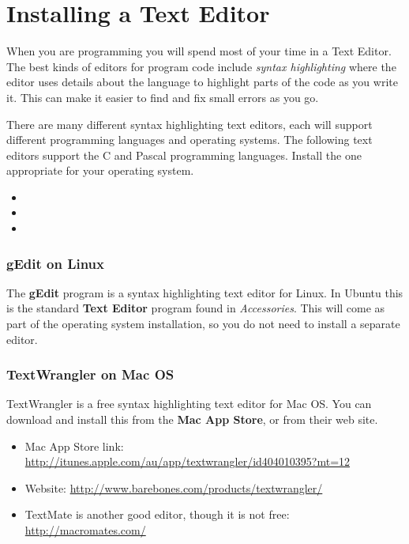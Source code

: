 \clearpage
\def\pageLang{none}
\section{Installing a Text Editor} %
\label{sec:installing_a_text_editor}

When you are programming you will spend most of your time in a Text Editor. The best kinds of editors for program code include \emph{syntax highlighting} where the editor uses details about the language to highlight parts of the code as you write it. This can make it easier to find and fix small errors as you go.

There are many different syntax highlighting text editors, each will support different programming languages and operating systems. The following text editors support the C and Pascal programming languages. Install the one appropriate for your operating system.

\begin{itemize}
  \item {}
  \item {}
  \item {}
\end{itemize}

\subsubsection{gEdit on Linux} %
\label{ssub:gedit_on_linux}

The \textbf{gEdit} program is a syntax highlighting text editor for Linux. In Ubuntu this is the standard \textbf{Text Editor} program found in \emph{Accessories}. This will come as part of the operating system installation, so you do not need to install a separate editor. 


\subsubsection{TextWrangler on Mac OS} %
\label{ssub:textwrangler_or_textmate_on_mac_os}

TextWrangler is a free syntax highlighting text editor for Mac OS. You can download and install this from the \textbf{Mac App Store}, or from their web site.

\begin{itemize}
  \item Mac App Store link: \url{http://itunes.apple.com/au/app/textwrangler/id404010395?mt=12}
  \item Website: \url{http://www.barebones.com/products/textwrangler/}
  \item TextMate is another good editor, though it is not free: \url{http://macromates.com/}
\end{itemize}

